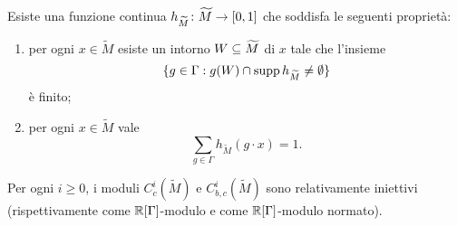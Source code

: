 \begin{lemma}
Esiste una funzione continua $\map{h_{\widetilde M}}{\widetilde M}{[0,1]}$ che soddisfa le seguenti proprietà:
\begin{enumerate}
\item per ogni $x\in\widetilde M$ esiste un intorno $W\subseteq \widetilde M$ di $x$ tale che l'insieme
\[
\{g\in\Gamma:g(W)\cap \operatorname{supp} h_{\widetilde M}\neq\emptyset\}
\]
è finito;
\item per ogni $x\in\widetilde M$ vale
\[
\sum_{g\in\Gamma}h_{\widetilde M}(g\cdot x)=1.
\]
\end{enumerate}
\end{lemma}

\begin{proposition}
Per ogni $i\ge 0$, i moduli $C^i_c(\widetilde M)$ e $C^i_{b,c}(\widetilde M)$ sono relativamente iniettivi (rispettivamente come $\mathbb{R}[\Gamma]$-modulo e come $\mathbb{R}[\Gamma]$-modulo normato).
\end{proposition}
